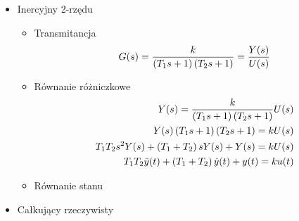 \documentclass[a4paper,10pt]{article}
\begin{document}
\begin{itemize}
\item Inercyjny 2-rzędu
\begin{itemize}
\item Transmitancja
	\begin{eqnarray}
		G(s)= {k \over \left({T_{1}s + 1}\right) \left({T_{2}s + 1}\right)} = {Y(s) \over U(s)}
	\end{eqnarray}
\item Równanie różniczkowe
	\begin{eqnarray}
		Y(s) = {k \over {\left({T_{1}s + 1}\right) \left({T_{2}s + 1}\right)}} U(s)\\
		\nonumber Y(s)\left({T_{1}s + 1}\right) \left({T_{2}s + 1}\right)= kU(s)\\
		\nonumber T_{1}T_{2}s^{2}Y(s) + \left({T_{1} + T_{2}}\right) s Y(s) + Y(s)= kU(s)\\
		\nonumber T_{1}T_{2}\ddot{y}(t) + \left({T_{1} + T_{2}}\right) \dot{y}(t) + y(t)= k u(t)
	\end{eqnarray}
\item Równanie stanu
\end{itemize}

\item Całkujący rzeczywisty


\end{itemize}
\end{document}
